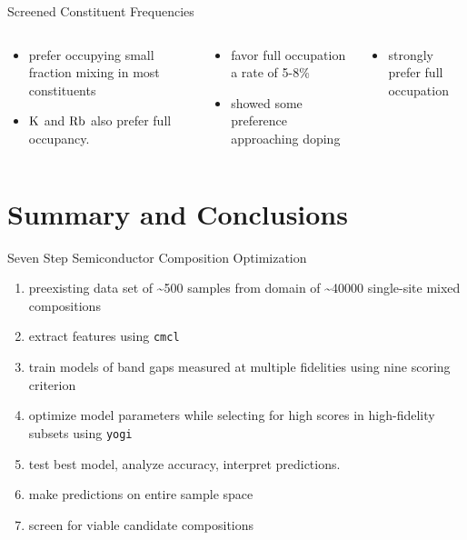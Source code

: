 \documentclass[10pt, aspectratio=169, presentation]{beamer}
\begin{document}
\begin{frame}[label={sec:orge219a05}]{Screened Constituent Frequencies}
 
\begin{center}

\end{center}

\begin{columns}
\begin{column}{0.3\columnwidth}
\begin{itemize}
\item prefer occupying small fraction mixing in most constituents
\item \(\ce{K}\) and \(\ce{Rb}\) also prefer full occupancy.
\end{itemize}
\end{column}

\begin{column}{0.3\columnwidth}
\begin{itemize}
\item favor full occupation a rate of 5-8\%
\item showed some preference approaching doping
\end{itemize}
\end{column}

\begin{column}{0.3\columnwidth}
\begin{itemize}
\item strongly prefer full occupation
\end{itemize}
\end{column}
\end{columns}
\end{frame}

\section{Summary and Conclusions}
\label{sec:orgd8888fb}
\begin{frame}[label={sec:org9d17fc3},fragile]{Seven Step Semiconductor Composition Optimization}
 \begin{enumerate}
\item preexisting data set of \textasciitilde{}500 samples from domain of \textasciitilde{}40000 single-site mixed compositions
\item extract features using \texttt{cmcl}
\item train models of band gaps measured at multiple fidelities \alert{using nine scoring criterion}
\item optimize model parameters while selecting for high scores in high-fidelity subsets using \texttt{yogi}
\item test best model, analyze accuracy, interpret predictions.
\item make predictions on \alert{entire sample space}
\item screen for viable candidate compositions
\end{enumerate}
\end{frame}
\end{document}
